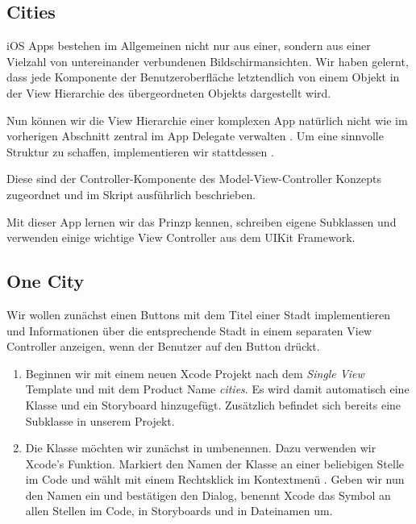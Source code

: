 \documentclass[parskip=half, final]{scrreprt}
\begin{document}
\begin{lecture}


\chapter{Cities}

\mvcindicatorcontroller

iOS Apps bestehen im Allgemeinen nicht nur aus einer, sondern aus einer Vielzahl von untereinander verbundenen Bildschirmansichten. Wir haben gelernt, dass jede Komponente der Benutzeroberfläche letztendlich von einem  Objekt in der View Hierarchie des übergeordneten  Objekts dargestellt wird.

Nun können wir die View Hierarchie einer komplexen App natürlich nicht wie im vorherigen Abschnitt zentral im App Delegate verwalten . Um eine sinnvolle Struktur zu schaffen, implementieren wir stattdessen .

Diese sind der Controller-Komponente des Model-View-Controller Konzepts zugeordnet und im Skript ausführlich beschrieben.

Mit dieser App lernen wir das  Prinzp kennen, schreiben eigene  Subklassen und verwenden einige wichtige View Controller aus dem UIKit Framework.


\section{One City}

Wir wollen zunächst einen Buttons mit dem Titel einer Stadt implementieren und Informationen über die entsprechende Stadt in einem separaten View Controller anzeigen, wenn der Benutzer auf den Button drückt.

\begin{enumerate}

\item Beginnen wir mit einem neuen Xcode Projekt nach dem \emph{Single View} Template und mit dem Product Name \emph{cities}. Es wird damit automatisch eine Klasse  und ein Storyboard hinzugefügt. Zusätzlich befindet sich bereits eine Subklasse  in unserem Projekt.

\item Die Klasse  möchten wir zunächst in  umbenennen. Dazu verwenden wir Xcode's  Funktion. Markiert den Namen der Klasse an einer beliebigen Stelle im Code und wählt mit einem Rechtsklick im Kontextmenü  . Geben wir nun den Namen  ein und bestätigen den Dialog, benennt Xcode das Symbol an allen Stellen im Code, in Storyboards und in Dateinamen um.


\end{enumerate}
\end{lecture}
\end{document}
